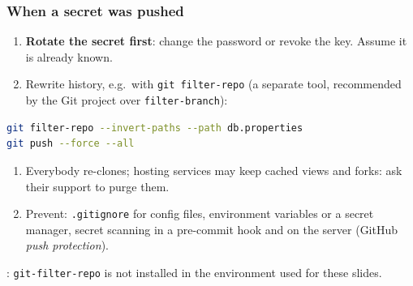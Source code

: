 \documentclass[aspectratio=169,10pt,compress]{beamer}
\begin{document}
\begin{frame}[t,fragile] \frametitle{When a secret was pushed}
  \begin{enumerate}\small
    \item \textbf{Rotate the secret first}: change the password or revoke the key. Assume it is already known.
    \item Rewrite history, e.g.\ with \texttt{git filter-repo} (a separate tool, recommended by the Git project over \texttt{filter-branch}):
  \end{enumerate}


\begin{lstlisting}[style=codesnippet, language=bash, basicstyle=\ttfamily\scriptsize]
git filter-repo --invert-paths --path db.properties
git push --force --all
\end{lstlisting}


  \begin{enumerate}\small \setcounter{enumi}{2}
    \item Everybody re-clones; hosting services may keep cached views and forks: ask their support to purge them.
    \item Prevent: \texttt{.gitignore} for config files, environment variables or a secret manager, secret scanning in a pre-commit hook and on the server
          (GitHub \emph{push protection}).
  \end{enumerate}
  \small {}: \texttt{git-filter-repo} is not installed in the environment used for these slides.
\end{frame}
\end{document}
